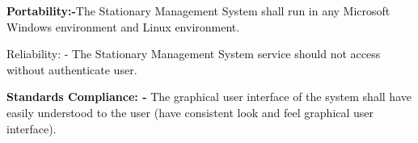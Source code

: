 \documentclass[12pt]{report}
\renewcommand{\_}{\kern-1.5pt\textunderscore\kern-1.5pt}
\begin{document}
\begin{adjustwidth}{0.2in}{0.84in}
\begin{justify}
\textcolor[HTML]{0D0D0D}{ }
\end{justify}\par

\end{adjustwidth}

\begin{adjustwidth}{0.2in}{0.84in}
\begin{justify}
\textbf{\textcolor[HTML]{0D0D0D}{Portability:-}}\textcolor[HTML]{0D0D0D}{The Stationary Management System shall run in any Microsoft Windows environment and Linux environment.}
\end{justify}\par

\end{adjustwidth}

\begin{adjustwidth}{0.2in}{0.84in}
\begin{justify}
\textcolor[HTML]{0D0D0D}{Reliability: - The Stationary Management System service should not access without authenticate user.}
\end{justify}\par

\end{adjustwidth}

\begin{adjustwidth}{0.2in}{0.84in}
\begin{justify}
\textcolor[HTML]{0D0D0D}{ }
\end{justify}\par

\end{adjustwidth}

\begin{adjustwidth}{0.2in}{0.84in}
\begin{justify}
\textbf{\textcolor[HTML]{0D0D0D}{Standards Compliance: -}}\textcolor[HTML]{0D0D0D}{ The graphical user interface of the system shall have easily understood to the user (have consistent look and feel graphical user interface).}
\end{justify}\par

\end{adjustwidth}

\begin{adjustwidth}{0.2in}{0.84in}
\begin{justify}
\textcolor[HTML]{0D0D0D}{ }
\end{justify}\par

\end{adjustwidth}
\end{document}
